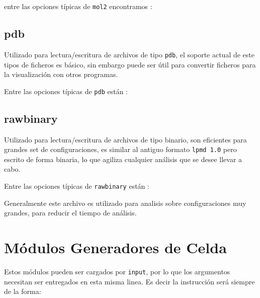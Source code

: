 entre las opciones t\'ipicas de \verb|mol2| encontramos :


\subsection{pdb}
Utilizado para lectura/escritura de archivos de tipo \verb|pdb|, el soporte actual de este tipos de ficheros es b\'asico, sin embargo puede ser \'util para convertir ficheros para la visualizaci\'on con otros programas.

Entre las opciones t\'ipicas de \verb|pdb| est\'an :


\subsection{rawbinary}
Utilizado para lectura/escritura de archivos de tipo binario, son eficientes para grandes set de configuraciones, es similar al antiguo formato \verb|lpmd 1.0| pero escrito de forma binaria, lo que agiliza cualquier an\'alisis que se desee llevar a cabo.

Entre las opciones t\'ipicas de \verb|rawbinary| est\'an :


Generalmente este archivo es utilizado para analisis sobre configuraciones muy grandes, para reducir el tiempo de an\'alisis.

\section{M\'odulos Generadores de Celda}
\label{chap:modulos:generadores}
Estos m\'odulos pueden ser cargados por \verb|input|, por lo que los argumentos necesitan ser entregados en esta misma linea. Es decir la instrucci\'on ser\'a siempre de la forma:

